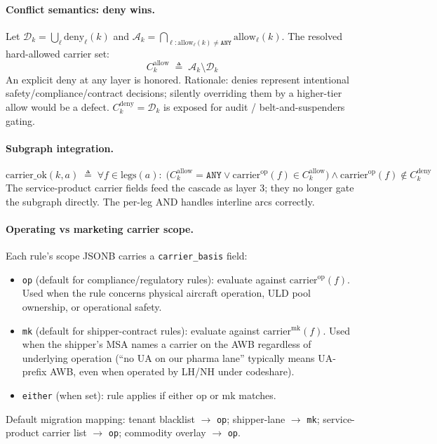 \documentclass[11pt,a4paper]{article}
\newcommand{\defeq}{\triangleq}
\theoremstyle{definition}
\begin{document}
\paragraph{Conflict semantics: deny wins.}
Let $\mathcal{D}_k = \bigcup_{\ell} \text{deny}_\ell(k)$ and
$\mathcal{A}_k = \bigcap_{\ell : \text{allow}_\ell(k) \neq \texttt{ANY}} \text{allow}_\ell(k)$.
The resolved hard-allowed carrier set:
\begin{equation}
  C_k^{\text{allow}} \;\defeq\; \mathcal{A}_k \setminus \mathcal{D}_k
  \label{eq:carrier-allow}
\end{equation}
An explicit deny at any layer is honored. Rationale: denies represent
intentional safety/compliance/contract decisions; silently overriding them
by a higher-tier allow would be a defect. $C_k^{\text{deny}} = \mathcal{D}_k$
is exposed for audit / belt-and-suspenders gating.

\paragraph{Subgraph integration.}
\begin{equation}
  \text{carrier\_ok}(k, a) \;\defeq\;
    \forall f \in \text{legs}(a):\;
    \bigl(C_k^{\text{allow}} = \texttt{ANY} \vee \text{carrier}^{\text{op}}(f) \in C_k^{\text{allow}}\bigr)
    \wedge \text{carrier}^{\text{op}}(f) \notin C_k^{\text{deny}}
  \label{eq:carrier-ok-resolved}
\end{equation}
The service-product carrier fields feed the cascade as layer 3; they no
longer gate the subgraph directly. The per-leg AND handles interline arcs
correctly.

\paragraph{Operating vs marketing carrier scope.}
Each rule's scope JSONB carries a \texttt{carrier\_basis} field:
\begin{itemize}[noitemsep]
  \item \texttt{op} (default for compliance/regulatory rules): evaluate
        against $\text{carrier}^{\text{op}}(f)$. Used when the rule concerns
        physical aircraft operation, ULD pool ownership, or operational
        safety.
  \item \texttt{mk} (default for shipper-contract rules): evaluate against
        $\text{carrier}^{\text{mk}}(f)$. Used when the shipper's MSA names a
        carrier on the AWB regardless of underlying operation (``no UA on
        our pharma lane'' typically means UA-prefix AWB, even when operated
        by LH/NH under codeshare).
  \item \texttt{either} (when set): rule applies if either op or mk matches.
\end{itemize}
Default migration mapping: tenant blacklist $\to$ \texttt{op}; shipper-lane
$\to$ \texttt{mk}; service-product carrier list $\to$ \texttt{op};
commodity overlay $\to$ \texttt{op}.
\end{document}
